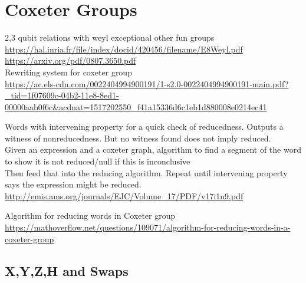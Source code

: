\documentclass[11pt]{article}
\theoremstyle{change}
\theoremstyle{nonumberplain}
\numberwithin{equation}{section}
\begin{document}
\section{Coxeter Groups}

2,3 qubit relations with weyl exceptional other fun groups\\
\url{https://hal.inria.fr/file/index/docid/420456/filename/E8Weyl.pdf}\\
\url{https://arxiv.org/pdf/0807.3650.pdf}\\

Rewriting system for coxeter group\\
\url{https://ac.els-cdn.com/0022404994900191/1-s2.0-0022404994900191-main.pdf?_tid=1f07609c-04b2-11e8-8ed1-00000aab0f6c&acdnat=1517202550_f41a15336d6c1eb1d880008e0214ec41}

Words with intervening property for a quick check of reducedness. Outputs a witness of nonreducedness. But no witness found does not imply reduced.\\
Given an expression and a coxeter graph, algorithm to find a segment of the word to show it is not reduced/null if this is inconclusive\\
Then feed that into the reducing algorithm. Repeat until intervening property says the expression might be reduced.\\
\url{http://emis.ams.org/journals/EJC/Volume_17/PDF/v17i1n9.pdf}

Algorithm for reducing words in Coxeter group\\
\url{https://mathoverflow.net/questions/109071/algorithm-for-reducing-words-in-a-coxeter-group}

\subsection{X,Y,Z,H and Swaps}
\end{document}
